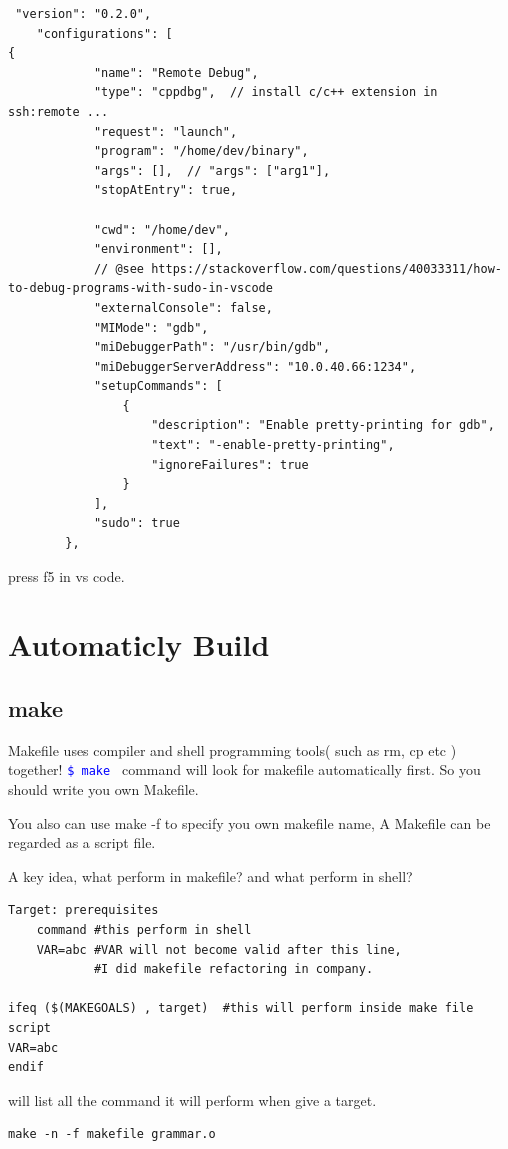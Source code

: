 \documentclass[paper=8.5in:11in, twoside, 12pt, pagesize=pdftex]{book}
\newcommand{\linuxcommand}[1]{\texttt{\textcolor{blue}{\$ #1 \Pisymbol{psy}{191}}}}
\begin{document}
\begin{lstlisting}
 "version": "0.2.0",
    "configurations": [
{
            "name": "Remote Debug",
            "type": "cppdbg",  // install c/c++ extension in ssh:remote ...
            "request": "launch",
            "program": "/home/dev/binary",
            "args": [],  // "args": ["arg1"],  
            "stopAtEntry": true,
            
            "cwd": "/home/dev",
            "environment": [],
            // @see https://stackoverflow.com/questions/40033311/how-to-debug-programs-with-sudo-in-vscode
            "externalConsole": false,
            "MIMode": "gdb",
            "miDebuggerPath": "/usr/bin/gdb", 
            "miDebuggerServerAddress": "10.0.40.66:1234", 
            "setupCommands": [
                {
                    "description": "Enable pretty-printing for gdb",
                    "text": "-enable-pretty-printing",
                    "ignoreFailures": true
                }
            ],
            "sudo": true
        },
\end{lstlisting}
press f5 in vs code.



\section{Automaticly Build}
\subsection{make}

Makefile uses compiler and shell programming tools( such as rm, cp etc ) together! \linuxcommand{make} command will look for makefile automatically first. So you should write you own Makefile.

You also can use make -f to specify you own makefile name, A Makefile can be regarded as a script file.

A key idea, what perform in makefile? and what perform in shell? 
\begin{verbatim}
Target: prerequisites
	command #this perform in shell
	VAR=abc #VAR will not become valid after this line,
	        #I did makefile refactoring in company.

ifeq ($(MAKEGOALS) , target)  #this will perform inside make file script
VAR=abc
endif
\end{verbatim}

will list all the command it will perform when give a target.
\begin{verbatim}
make -n -f makefile grammar.o
\end{verbatim}		
\end{document}
